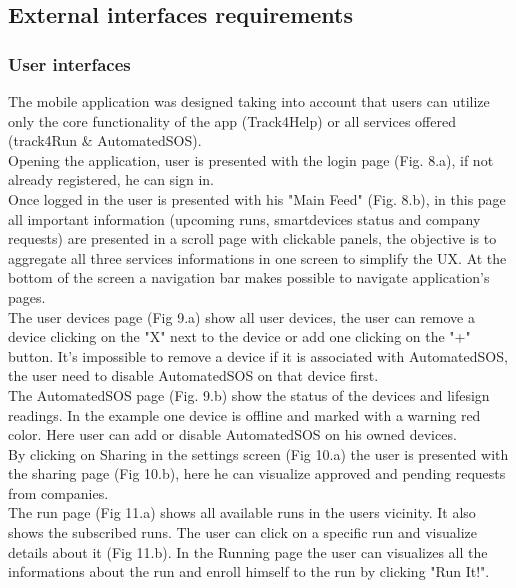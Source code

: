 \documentclass[../main.tex]{subfiles}
\begin{document}
\subsection{External interfaces requirements}

\subsubsection{User interfaces}

The mobile application was designed taking into account that users can utilize only the core functionality of the app (Track4Help) or all services offered (track4Run \& AutomatedSOS).\\ 
Opening the application, user is presented with the login page (Fig. 8.a), if not already registered, he can sign in.\\
 Once logged in the user is presented with his "Main Feed" (Fig. 8.b), in this page all important information (upcoming runs, smartdevices status and company requests) are presented in a scroll page with clickable panels,
  the objective is to aggregate all three services informations in one screen to simplify the UX. 
 At the bottom of the screen a navigation bar makes possible to navigate application's pages.\\ 
 The user devices page (Fig 9.a) show all user devices, the user can remove a device clicking on the "X" next to the device or add one clicking on the "+" button. 
 It's impossible to remove a device if it is associated with AutomatedSOS, the user need to disable AutomatedSOS on that device first.\\
 The AutomatedSOS page (Fig. 9.b) show the status of the devices and lifesign readings. In the example one device is offline and marked with a warning red color. 
 Here user can add or disable AutomatedSOS on his owned devices.\\
By clicking on Sharing in the settings screen (Fig 10.a) the user is presented with the sharing page (Fig 10.b), here he can visualize approved and pending requests from companies.\\ 
 The run page (Fig 11.a) shows all available runs in the users vicinity. It also shows the subscribed runs. The user can click on a specific run and visualize details about it (Fig 11.b). 
 In the Running page the user can visualizes all the informations about the run and enroll himself to the run by clicking "Run It!".
\end{document}

